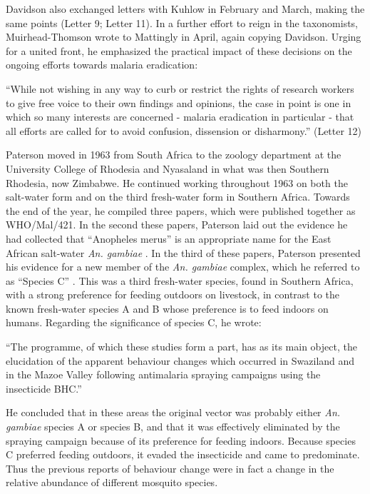 \documentclass[a4paper,11pt,abstracton,hidelinks]{scrartcl}
\begin{document}
Davidson also exchanged letters with Kuhlow in February and March, making the same points (Letter 9; Letter 11). In a further effort to reign in the taxonomists, Muirhead-Thomson wrote to Mattingly in April, again copying Davidson. Urging for a united front, he emphasized the practical impact of these decisions on the ongoing efforts towards malaria eradication:


\begin{displayquote}
``While not wishing in any way to curb or restrict the rights of research workers to give free voice to their own findings and opinions, the case in point is one in which so many interests are concerned - malaria eradication in particular - that all efforts are called for to avoid confusion, dissension or disharmony.'' (Letter 12)
\end{displayquote}


Paterson moved in 1963 from South Africa to the zoology department at the University College of Rhodesia and Nyasaland in what was then Southern Rhodesia, now Zimbabwe. He continued working throughout 1963 on both the salt-water form and on the third fresh-water form in Southern Africa. Towards the end of the year, he compiled three papers, which were published together as WHO/Mal/421. In the second these papers, Paterson laid out the evidence he had collected that ``Anopheles merus'' is an appropriate name for the East African salt-water \textit{An. gambiae} \citep{Paterson1963a}. In the third of these papers, Paterson presented his evidence for a new member of the \textit{An. gambiae} complex, which he referred to as ``Species C'' \citep{Paterson1963b}. This was a third fresh-water species, found in Southern Africa, with a strong preference for feeding outdoors on livestock, in contrast to the known fresh-water species A and B whose preference is to feed indoors on humans. Regarding the significance of species C, he wrote:


\begin{displayquote}
``The programme, of which these studies form a part, has as its main object, the elucidation of the apparent behaviour changes which occurred in Swaziland and in the Mazoe Valley following antimalaria spraying campaigns using the insecticide BHC.'' \citep{Paterson1963b}
\end{displayquote}


He concluded that in these areas the original vector was probably either \textit{An. gambiae} species A or species B, and that it was effectively eliminated by the spraying campaign because of its preference for feeding indoors. Because species C preferred feeding outdoors, it evaded the insecticide and came to predominate. Thus the previous reports of behaviour change were in fact a change in the relative abundance of different mosquito species.
\end{document}
